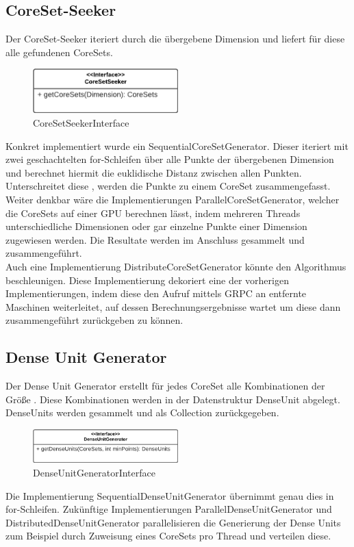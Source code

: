 \subsection{CoreSet-Seeker}
Der CoreSet-Seeker iteriert durch die übergebene Dimension und liefert für diese alle gefundenen CoreSets.
\begin{figure}[h]
	\centering
	\includegraphics[width=0.5\textwidth]{./Bilder/Restrukturierung/CoreSetSeeker.png}
	\caption{CoreSetSeekerInterface}
\end{figure}
Konkret implementiert wurde ein SequentialCoreSetGenerator. Dieser iteriert mit zwei geschachtelten for-Schleifen über alle Punkte der übergebenen Dimension und berechnet hiermit die euklidische Distanz zwischen allen Punkten. Unterschreitet diese \epsilon, werden die Punkte zu einem CoreSet zusammengefasst.\\
Weiter denkbar wäre die Implementierungen ParallelCoreSetGenerator, welcher die CoreSets auf einer GPU berechnen lässt, indem mehreren Threads unterschiedliche Dimensionen oder gar einzelne Punkte einer Dimension zugewiesen werden. Die Resultate werden im Anschluss gesammelt und zusammengeführt.\\
Auch eine Implementierung DistributeCoreSetGenerator könnte den Algorithmus beschleunigen. Diese Implementierung dekoriert eine der vorherigen Implementierungen, indem diese den Aufruf mittels GRPC an entfernte Maschinen weiterleitet, auf dessen Berechnungsergebnisse wartet um diese dann zusammengeführt zurückgeben zu können.

\subsection{Dense Unit Generator}
Der Dense Unit Generator erstellt für jedes CoreSet alle Kombinationen der Größe \tau. Diese Kombinationen werden in der Datenstruktur DenseUnit abgelegt. DenseUnits werden gesammelt und als Collection zurückgegeben.
\begin{figure}[h]
	\centering
	\includegraphics[width=0.5\textwidth]{./Bilder/Restrukturierung/DenseUnitGenerator.png}
	\caption{DenseUnitGeneratorInterface}
\end{figure}
Die Implementierung SequentialDenseUnitGenerator übernimmt genau dies in for-Schleifen. Zukünftige Implementierungen ParallelDenseUnitGenerator und DistributedDenseUnitGenerator parallelisieren die Generierung der Dense Units zum Beispiel durch Zuweisung eines CoreSets pro Thread und verteilen diese.

